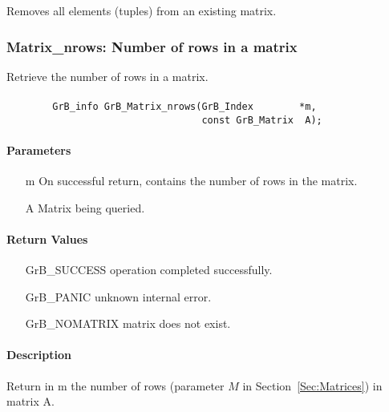 Removes all elements (tuples) from an existing matrix.

\subsubsection{{\sf Matrix\_nrows}: Number of rows in a matrix}

Retrieve the number of rows in a matrix.

\paragraph{\syntax}

\begin{verbatim}
        GrB_info GrB_Matrix_nrows(GrB_Index        *m,
                                  const GrB_Matrix  A);
\end{verbatim}

\paragraph{Parameters}

\begin{itemize}[leftmargin=1.1in]
    \item[{\sf m}] On successful return, contains the number of rows in the matrix.
    \item[{\sf A}] Matrix being queried.
\end{itemize}


\paragraph{Return Values}

\begin{itemize}[leftmargin=2.1in]
\item[{\sf GrB\_SUCCESS}]   operation completed successfully.
\item[{\sf GrB\_PANIC}]     unknown internal error.
\item[{\sf GrB\_NOMATRIX}]  matrix does not exist.
\end{itemize}

\paragraph{Description}

Return in {\sf m} the number of rows (parameter $M$ in Section~\ref{Sec:Matrices}) in matrix {\sf A}.

